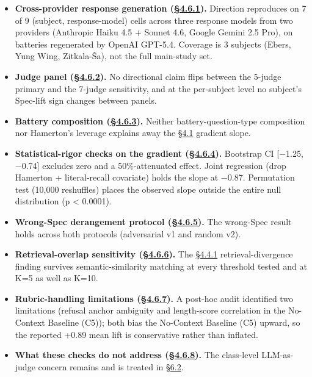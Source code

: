 \begin{itemize}
\tightlist
\item
  \textbf{Cross-provider response generation (\hyperref[cross-provider-response-generation-tier-2-replication]{§4.6.1}).} Direction
  reproduces on 7 of 9 (subject, response-model) cells across three
  response models from two providers (Anthropic Haiku 4.5 + Sonnet 4.6,
  Google Gemini 2.5 Pro), on batteries regenerated by OpenAI GPT-5.4.
  Coverage is 3 subjects (Ebers, Yung Wing, Zitkala-Ša), not the full
  main-study set.
\item
  \textbf{Judge panel (\hyperref[judge-panel-sensitivity-5-judge-primary-vs-7-judge]{§4.6.2}).} No directional claim flips between the
  5-judge primary and the 7-judge sensitivity, and at the per-subject
  level no subject's Spec-lift sign changes between panels.
\item
  \textbf{Battery composition (\hyperref[battery-composition-sensitivity]{§4.6.3}).} Neither battery-question-type
  composition nor Hamerton's leverage explains away the \hyperref[the-cross-subject-gradient-and-its-per-question-mechanism]{§4.1} gradient
  slope.
\item
  \textbf{Statistical-rigor checks on the gradient (\hyperref[statistical-rigor-checks-on-the-headline-gradient]{§4.6.4}).} Bootstrap
  CI {[}−1.25, −0.74{]} excludes zero and a 50\%-attenuated effect.
  Joint regression (drop Hamerton + literal-recall covariate) holds the
  slope at −0.87. Permutation test (10,000 reshuffles) places the
  observed slope outside the entire null distribution (p \textless{}
  0.0001).
\item
  \textbf{Wrong-Spec derangement protocol (\hyperref[wrong-spec-derangement-protocol-sensitivity]{§4.6.5}).} The wrong-Spec
  result holds across both protocols (adversarial v1 and random v2).
\item
  \textbf{Retrieval-overlap sensitivity (\hyperref[retrieval-overlap-sensitivity-semantic-similarity-matching-k-variation]{§4.6.6}).} The \hyperref[cross-system-retrieval-providers-do-not-converge]{§4.4.1}
  retrieval-divergence finding survives semantic-similarity matching at
  every threshold tested and at K=5 as well as K=10.
\item
  \textbf{Rubric-handling limitations (\hyperref[rubric-handling-limitations-post-hoc-validity-audit-1]{§4.6.7}).} A post-hoc audit
  identified two limitations (refusal anchor ambiguity and length-score
  correlation in the No-Context Baseline (C5)); both bias the No-Context
  Baseline (C5) upward, so the reported +0.89 mean lift is conservative
  rather than inflated.
\item
  \textbf{What these checks do not address (\hyperref[class-level-llm-dependence-the-limitation-no-robustness-check-resolves]{§4.6.8}).} The class-level
  LLM-as-judge concern remains and is treated in \hyperref[measurement-apparatus]{§6.2}.
\end{itemize}

